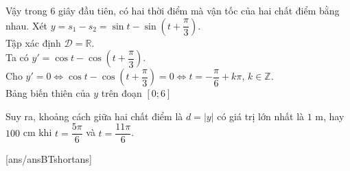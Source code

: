 \begin{ex}
{\begin{itemchoice}
Vậy trong $6$ giây đầu tiên, có hai thời điểm mà vận tốc của hai chất điểm bằng nhau.
\itemch Xét $y=s_1-s_2=\sin t - \sin\left(t+\dfrac{\pi}{3}\right)$.\\
Tập xác định $\mathscr{D}=\mathbb{R}$.\\
Ta có $y'=\cos t - \cos\left(t+\dfrac{\pi}{3}\right)$.\\
Cho $y'=0 \Leftrightarrow \cos t- \cos\left(t+\dfrac{\pi}{3}\right)=0 \Leftrightarrow t=-\dfrac{\pi}{6}+k\pi$, $k\in\mathbb{Z}$.\\
Bảng biến thiên của $y$ trên đoạn $[0;6]$
\begin{center}
\end{center}
Suy ra, khoảng cách giữa hai chất điểm là $d=|y|$ có giá trị lớn nhất là $1$ m, hay $100$ cm khi $t=\dfrac{5\pi}{6}$ và $t=\dfrac{11\pi}{6}$.\\
\end{itemchoice}
}
\end{ex}



[ans/ansBTshortans]

